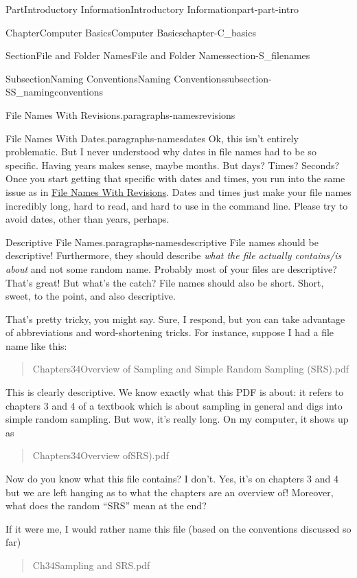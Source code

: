 \documentclass[oneside,10pt,]{book}
\begin{document}
\begin{partptx}{Part}{Introductory Information}{}{Introductory Information}{}{}{part-part-intro}
\begin{chapterptx}{Chapter}{Computer Basics}{}{Computer Basics}{}{}{chapter-C_basics}
\begin{sectionptx}{Section}{File and Folder Names}{}{File and Folder Names}{}{}{section-S_filenames}
\begin{subsectionptx}{Subsection}{Naming Conventions}{}{Naming Conventions}{}{}{subsection-SS_namingconventions}
\begin{paragraphs}{File Names With Revisions.}{paragraphs-namesrevisions}
\end{paragraphs}%
\begin{paragraphs}{File Names With Dates.}{paragraphs-namesdates}%
%
Ok, this isn't entirely problematic. But I never understood why dates in file names had to be so specific. Having years makes sense, maybe months. But days? Times? Seconds? Once you start getting that specific with dates and times, you run into the same issue as in \hyperlink{paragraphs-namesrevisions}{File Names With Revisions}. Dates and times just make your file names incredibly long, hard to read, and hard to use in the command line. Please try to avoid dates, other than years, perhaps.%
\end{paragraphs}%
\begin{paragraphs}{Descriptive File Names.}{paragraphs-namesdescriptive}%
%
%
File names should be descriptive! Furthermore, they should describe \emph{what the file actually contains\slash{}is about} and not some random name. Probably most of your files are descriptive? That's great! But what's the catch? File names should also be short. Short, sweet, to the point, and also descriptive.%
\par
That's pretty tricky, you might say. Sure, I respond, but you can take advantage of abbreviations and word-shortening tricks. For instance, suppose I had a file name like this:%
\begin{quote}%
Chapters3\textunderscore{}4\textunderscore{}Overview of Sampling and Simple Random Sampling (SRS).pdf%
\end{quote}
This is clearly descriptive. We know exactly what this PDF is about: it refers to chapters 3 and 4 of a textbook which is about sampling in general and digs into simple random sampling. But wow, it's really long. On my computer, it shows up as%
\begin{quote}%
Chapters3\textunderscore{}4\textunderscore{}Overview of\textellipsis{}SRS).pdf%
\end{quote}
Now do you know what this file contains? I don't. Yes, it's on chapters 3 and 4 but we are left hanging as to what the chapters are an overview of! Moreover, what does the random ``SRS'' mean at the end?%
\par
If it were me, I would rather name this file (based on the conventions discussed so far)%
\begin{quote}%
Ch3\textunderscore{}4\textunderscore{}Sampling and SRS.pdf%
\end{quote}

\end{paragraphs}
\end{subsectionptx}
\end{sectionptx}
\end{chapterptx}
\end{partptx}
\end{document}
